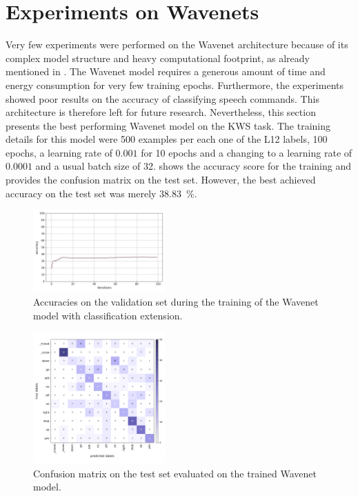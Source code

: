 
\section{Experiments on Wavenets}\label{exp_wavenet}
Very few experiments were performed on the Wavenet architecture because of its complex model structure and heavy computational footprint, as already mentioned in .
The Wavenet model requires a generous amount of time and energy consumption for very few training epochs.
Furthermore, the experiments showed poor results on the accuracy of classifying speech commands.
This architecture is therefore left for future research.
Nevertheless, this section presents the best performing Wavenet model on the KWS task.
The training details for this model were 500 examples per each one of the L12 labels, 100 epochs, a learning rate of $0.001$ for 10 epochs and a changing to a learning rate of $0.0001$ and a usual batch size of 32.
 shows the accuracy score for the training and  provides the confusion matrix on the test set.
However, the best achieved accuracy on the test set was merely \SI{38.83}{\percent}.
\begin{figure}[!ht]
  \centering
  \includegraphics[width=0.45\textwidth]{./5_exp/figs/exp_wavenet_acc.png}
  \caption{Accuracies on the validation set during the training of the Wavenet model with classification extension.}
  \label{fig:exp_wavenet_acc}
\end{figure}
\begin{figure}[!ht]
  \centering
  \includegraphics[width=0.45\textwidth]{./5_exp/figs/exp_wavenet_confusion_test.png}
  \caption{Confusion matrix on the test set evaluated on the trained Wavenet model.}
  \label{fig:exp_wavenet_confusion}
\end{figure}
\FloatBarrier
\noindent